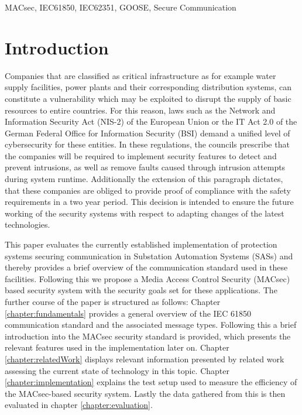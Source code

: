 \documentclass[conference, onecolumn, a4paper]{IEEEtran}
\begin{document}
\vspace{6 pt}

\begin{IEEEkeywords}
    MACsec, IEC61850, IEC62351, GOOSE, Secure Communication
\end{IEEEkeywords}

\section{Introduction}
\label{chapter:introduction}
\noindent Companies that are classified as critical infrastructure as for example water supply facilities, power plants and their corresponding 
distribution systems, can constitute a vulnerability which may be exploited to disrupt the supply of basic resources to entire countries. For this reason, 
laws such as the Network and Information Security Act (NIS-2) \cite{NIS-2:2022} of the European Union or the IT Act 2.0 \cite{IT-Gesetz_2:2021} of the 
German Federal Office for Information Security (BSI) demand a unified level of cybersecurity for these entities. In these regulations, the councils 
prescribe that the companies will be required to implement security features to detect and prevent intrusions, as well as remove faults caused through 
intrusion attempts during system runtime. \cite[§11 (1d)]{IT-Gesetz_2:2021} Additionally the extension of this paragraph dictates, that these companies 
are obliged to provide proof of compliance with the safety requirements in a two year period. \cite[§11 (1e)]{IT-Gesetz_2:2021} This decision is intended 
to ensure the future working of the security systems with respect to adapting changes of the latest technologies. 

\smallskip
This paper evaluates the currently established implementation of protection systems securing communication in Substation Automation Systems (SASs) and 
thereby provides a brief overview of the communication standard used in these facilities. Following this we propose a Media Access Control Security 
(MACsec) based security system with the security goals set for these applications. The further course of the paper is structured as follows: 
Chapter \ref{chapter:fundamentals} provides a general overview of the IEC 61850 communication standard and the associated  message types. Following this 
a brief introduction into the MACsec security standard is provided, which presents the relevant features used in the implementation later on. Chapter 
\ref{chapter:relatedWork} displays relevant information presented by related work assessing the current state of technology in this topic. Chapter 
\ref{chapter:implementation} explains the test setup used to measure the efficiency of the MACsec-based security system. Lastly the data gathered from 
this is then evaluated in chapter \ref{chapter:evaluation}. 
\pagebreak
\end{document}
